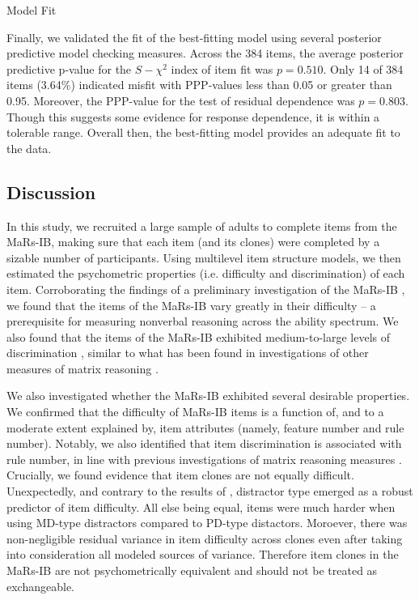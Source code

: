 \documentclass[a4paper,man,natbib]{apa6}
\makeatletter
\renewcommand{\subsubsection}{\@startsection{subsubsection}{3}
  {\z@}%
  {\b@level@two@skip}{\e@level@two@skip}%
  {\normalfont\normalsize\bfseries}}
\makeatother
\begin{document}
\subsubsection{Model Fit}

Finally, we validated the fit of the best-fitting model using several posterior predictive model checking measures. Across the 384 items, the average posterior predictive p-value for the $S-\chi^2$ index of item fit was $p = 0.510$. Only 14 of 384 items (3.64\%) indicated misfit with PPP-values less than 0.05 or greater than 0.95. Moreover, the PPP-value for the test of residual dependence was $p = 0.803$. Though this suggests some evidence for response dependence, it is within a tolerable range. Overall then, the best-fitting model provides an adequate fit to the data.

\subsection{Discussion}

In this study, we recruited a large sample of adults to complete items from the MaRs-IB, making sure that each item (and its clones) were completed by a sizable number of participants. Using multilevel item structure models, we then estimated the psychometric properties (i.e. difficulty and discrimination) of each item. Corroborating the findings of a preliminary investigation of the MaRs-IB \citep{chierchia2019matrix}, we found that the items of the MaRs-IB vary greatly in their difficulty -- a prerequisite for measuring nonverbal reasoning across the ability spectrum. We also found that the items of the MaRs-IB exhibited medium-to-large levels of discrimination \citep{baker2017basics}, similar to what has been found in investigations of other measures of matrix reasoning \citep{chiesi2012using}.

We also investigated whether the MaRs-IB exhibited several desirable properties. We confirmed that the difficulty of MaRs-IB items is a function of, and to a moderate extent explained by, item attributes (namely, feature number and rule number). Notably, we also identified that item discrimination is associated with rule number, in line with previous investigations of matrix reasoning measures \citep{embretson1999generating}. Crucially, we found evidence that item clones are not equally difficult. Unexpectedly, and contrary to the results of \cite{chierchia2019matrix}, distractor type emerged as a robust predictor of item difficulty. All else being equal, items were much harder when using MD-type distractors compared to PD-type distactors. Moroever, there was non-negligible residual variance in item difficulty across clones even after taking into consideration all modeled sources of variance. Therefore item clones in the MaRs-IB are not psychometrically equivalent and should not be treated as exchangeable. 
\end{document}
